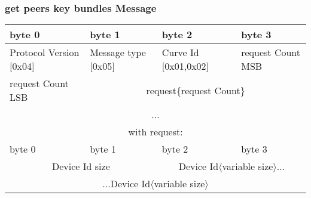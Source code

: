 \documentclass[a4paper,11pt]{article}
\begin{document}
    \subsubsection{get peers key bundles Message}
      \begin{center}
      \begin{tabular}{ | p{1.4in} | p{1.4in} | p{1.4in} | p{1.4in} |}
        \hline
        \cellcolor[gray]{0.85} byte 0 & \cellcolor[gray]{0.85} byte 1 & \cellcolor[gray]{0.85} byte 2 & \cellcolor[gray]{0.85}byte 3\\
        \hline
        Protocol Version [0x04] & Message type [0x05] & Curve Id [0x01,0x02] & request Count MSB\\
        \hline
        request Count LSB & \multicolumn{3}{|c|}{request\{request Count\}}\\
        \cline{1-1}
        \multicolumn{4}{|c|}{...}\\
        \hline
        \multicolumn{4}{c}{with request:}\\
        \hline
        \cellcolor[gray]{0.95} byte 0 & \cellcolor[gray]{0.95} byte 1 & \cellcolor[gray]{0.95} byte 2 & \cellcolor[gray]{0.95}byte 3\\
        \hline
        \multicolumn{2}{|c|}{Device Id size}&\multicolumn{2}{|c|}{Device Id$\langle$variable size$\rangle$...}\\
        \hline
        \multicolumn{4}{|c|}{...Device Id$\langle$variable size$\rangle$}\\
        \hline
      \end{tabular}
      \end{center}
    
\end{document}
